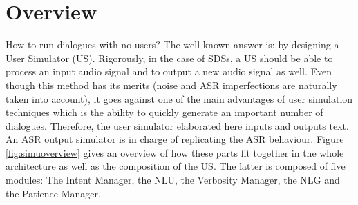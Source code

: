 						
\section{Overview}
	
	How to run dialogues with no users? The well known answer is: by designing a User Simulator (US). Rigorously, in the case of SDSs, a US should be able to process an input audio signal and to output a new audio signal as well. Even though this method has its merits (noise and ASR imperfections are naturally taken into account), it goes against one of the main advantages of user simulation techniques which is the ability to quickly generate an important number of dialogues. Therefore, the user simulator elaborated here inputs and outputs text. An ASR output simulator is in charge of replicating the ASR behaviour. Figure \ref{fig:simuoverview} gives an overview of how these parts fit together in the whole architecture as well as the composition of the US. The latter is composed of five modules: The Intent Manager, the NLU, the Verbosity Manager, the NLG and the Patience Manager.
	

